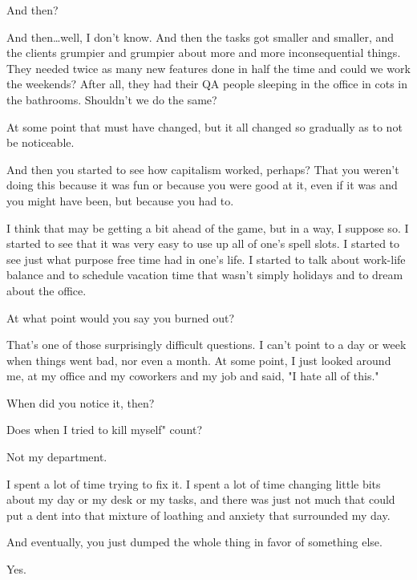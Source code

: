 \begin{ally}
And then?
\end{ally}
And then\ldots{}well, I don't know. And then the tasks got smaller and smaller, and the clients grumpier and grumpier about more and more inconsequential things. They needed twice as many new features done in half the time and could we work the weekends? After all, they had their QA people sleeping in the office in cots in the bathrooms. Shouldn't we do the same?

At some point that must have changed, but it all changed so gradually as to not be noticeable.

\begin{ally}
And then you started to see how capitalism worked, perhaps? That you weren't doing this because it was fun or because you were good at it, even if it was and you might have been, but because you had to.
\end{ally}
I think that may be getting a bit ahead of the game, but in a way, I suppose so. I started to see that it was very easy to use up all of one's spell slots. I started to see just what purpose free time had in one's life. I started to talk about work-life balance and to schedule vacation time that wasn't simply holidays and to dream about the office.

\newpage

\begin{ally}
At what point would you say you burned out?
\end{ally}
That's one of those surprisingly difficult questions. I can't point to a day or week when things went bad, nor even a month. At some point, I just looked around me, at my office and my coworkers and my job and said, "I hate all of this."

\begin{ally}
When did you notice it, then?
\end{ally}
Does when I tried to kill myself" count?

\begin{ally}
Not my department.
\end{ally}
I spent a lot of time trying to fix it. I spent a lot of time changing little bits about my day or my desk or my tasks, and there was just not much that could put a dent into that mixture of loathing and anxiety that surrounded my day.

\begin{ally}
And eventually, you just dumped the whole thing in favor of something else.
\end{ally}
Yes.

